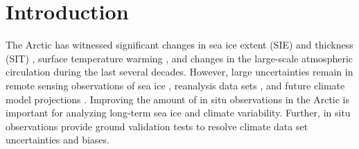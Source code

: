 \documentclass[draft,linenumbers]{agujournal}
\begin{document}
%
%

% 


%
% 
% 
% 


\section{Introduction}
The Arctic has witnessed significant changes in sea ice extent (SIE) \citep{Serreze2007} and thickness (SIT) \citep{Kwok2009}, surface temperature warming \citep{Screen2010}, and changes in the large-scale atmospheric circulation \citep{Overland2012, Cohen2014} during the last several decades. However, large uncertainties remain in remote sensing observations of sea ice \citep{Zygmuntowska2014, Ivanova2015}, reanalysis data sets \citep{Lindsay2014}, and future climate model projections \citep{Stroeve2012a, Rosenblum2017}. Improving the amount of in situ observations in the Arctic is important for analyzing long-term sea ice and climate variability. Further, in situ observations provide ground validation tests to resolve climate data set uncertainties and biases. 
\end{document}
